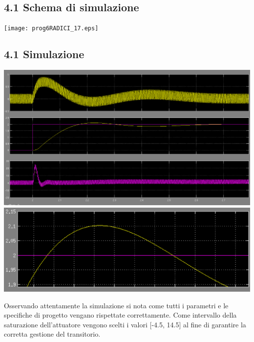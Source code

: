 \documentclass{article}
\begin{document}
\subsection*{4.1 Schema di simulazione}

\begin{par}
\texttt{[image: prog6RADICI\_17.eps]}
\end{par} \vspace{1em}


\subsection*{4.1 Simulazione}

\begin{par}
\includegraphics[width=\paperwidth,height=\textheight,keepaspectratio, angle=90]{simulazione.eps}
\includegraphics[width=\paperwidth,height=\textheight,keepaspectratio, angle=90]{sovraelonga.eps}
\end{par} \vspace{1em}
\begin{par}
Osservando attentamente la simulazione si nota come tutti i parametri e le specifiche di
progetto vengano rispettate correttamente. Come intervallo della saturazione dell'attuatore
vengono scelti i valori [-4.5, 14.5] al fine di garantire la corretta gestione del transitorio.
\end{par}
\end{document}
